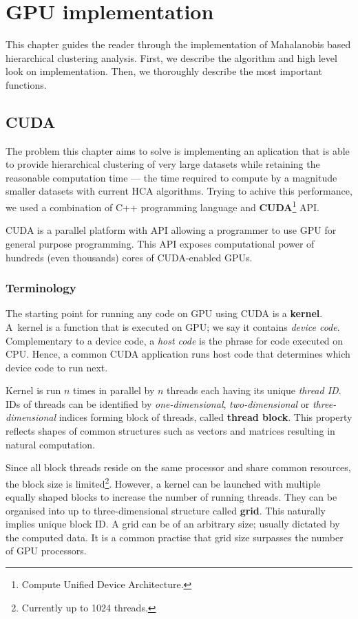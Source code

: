 \chapter{GPU implementation}

This chapter guides the reader through the implementation of Mahalanobis based hierarchical clustering analysis. First, we describe the algorithm and high level look on implementation. Then, we thoroughly describe the most important functions.

\section{CUDA}

The problem this chapter aims to solve is implementing an aplication that is able to provide hierarchical clustering of very large datasets while retaining the reasonable computation time --- the time required to compute by a magnitude smaller datasets with current HCA algorithms.
Trying to achive this performance, we used a combination of C++ programming language and \textbf{CUDA}\footnote{Compute Unified Device Architecture.} API.  

CUDA is a parallel platform with API allowing a programmer to use GPU for general purpose programming. This API exposes computational power of hundreds (even thousands) cores of CUDA-enabled GPUs.


\subsection{Terminology}

The starting point for running any code on GPU using CUDA is a \textbf{kernel}. A~kernel is a function that is executed on GPU; we say it contains \emph{device code}. Complementary to a device code, a \emph{host code} is the phrase for code executed on CPU. Hence, a common CUDA application runs host code that determines which device code to run next. 

Kernel is run $n$ times in parallel by $n$ threads each having its unique \emph{thread ID}. IDs of threads can be identified by \emph{one-dimensional}, \emph{two-dimensional} or \emph{three-dimensional} indices forming block of threads, called \textbf{thread block}. This property reflects shapes of common structures such as vectors and matrices resulting in natural computation.

Since all block threads reside on the same processor and share common resources, the block size is limited\footnote{Currently up to 1024 threads.}. However, a kernel can be launched with multiple equally shaped blocks to increase the number of running threads. They can be organised into up to three-dimensional structure called \textbf{grid}. This naturally implies unique block ID. A grid can be of an arbitrary size; usually dictated by the computed data. It is a common practise that grid size surpasses the number of GPU processors.


